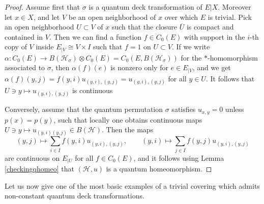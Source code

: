 \documentclass[a4paper]{amsart}
\newcommand*{\Hc}{\mathcal{H}}
\numberwithin{equation}{section}
\theoremstyle{change}
\begin{document}
\begin{proof} 
Assume first that $ \sigma $ is a quantum deck transformation of $ E|X $. Moreover let $ x \in X $, and let $ V $ be an open neighborhood of $ x $ over which $ E $ is trivial. Pick an open neighborhood $ U \subset V $ of $ x $ such that the closure $ \overline{U} $ is compact and contained in $ V $. Then we can find a 
function $ f \in C_0(E) $ with support in the $ i $-th copy of $ V $ inside $ E_{|V} \cong V \times I $ such that $ f = 1 $ on $ U \subset V $. If we write $ \alpha: C_0(E) \rightarrow B(\Hc_\sigma) \otimes C_0(E) = C_0(E, B(\Hc_\sigma)) $ for the $ * $-homomorphism associated to $ \sigma $, then 
$ \alpha(f)(e) $ is nonzero only for $ e \in E_{|V} $, and we get $ \alpha(f)(y, j) = f(y,i) u_{(y,i),(y,j)} = u_{(y,i),(y,j)} $ for all $ y \in U $. It follows that $ U \ni y \mapsto u_{(y,i),(y,j)} $ is continuous 

Conversely, assume that the quantum permutation $ \sigma $ satisfies $ u_{x,y} = 0 $ unless $ p(x) = p(y) $, such that locally one obtains  
continuous maps $ U \ni y \mapsto u_{(y,i)(y,j)} \in B(\Hc) $. Then the maps 
$$ 
(y,j) \mapsto \sum_{i \in I} f(y,i) u_{(y,i), (y, j)}, \qquad (y,i) \mapsto \sum_{j \in I} f(y,j) u_{(y,i), (y, j)} 
$$ 
are continuous on $ E_{|U} $ for all $ f \in C_0(E) $, and it follows using Lemma \ref{checkingqhomeo} that $ (\Hc, u) $ is a quantum homeomorphism. 
\end{proof} 

Let us now give one of the most basic examples of a trivial covering which admits non-constant quantum deck transformations. 
\end{document}
